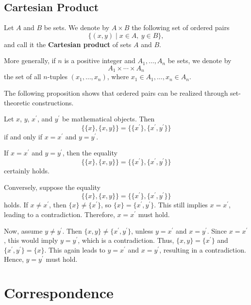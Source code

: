 \documentclass{book}
\begin{document}
\section{Cartesian Product}

\begin{definitionenv}
Let \(A\) and \(B\) be sets. We denote by \(A \times B\) the following set of ordered pairs
\[
\{(x, y) \mid x \in A,\ y \in B\},
\]
and call it the \textbf{Cartesian product} of sets \(A\) and \(B\).

More generally, if \(n\) is a positive integer and \(A_1, \ldots, A_n\) be sets, we denote by
\[
A_1 \times \cdots \times A_n
\]
the set of all \(n\)-tuples \((x_1, \ldots, x_n)\), where \(x_1 \in A_1, \ldots, x_n \in A_n\).
\end{definitionenv}

The following proposition shows that ordered pairs can be realized through set-theoretic constructions.

\begin{propositionenv}
Let \(x\), \(y\), \(x^{\prime}\), and \(y^{\prime}\) be mathematical objects. Then
\[
\{\{x\},\{x,y\}\}=\{\{x^{\prime}\},\{x^{\prime},y^{\prime}\}\}
\]
if and only if \(x=x^{\prime}\) and \(y=y^{\prime}\).
\end{propositionenv}

\begin{proofenv}
If \(x=x^{\prime}\) and \(y=y^{\prime}\), then the equality
\[
\{\{x\},\{x,y\}\}=\{\{x^{\prime}\},\{x^{\prime},y^{\prime}\}\}
\]
certainly holds.

Conversely, suppose the equality
\[
\{\{x\},\{x,y\}\}=\{\{x^{\prime}\},\{x^{\prime},y^{\prime}\}\}
\]
holds. If \(x\neq x^{\prime}\), then \(\{x\}\neq\{x^{\prime}\}\), so \(\{x\}=\{x^{\prime},y^{\prime}\}\). This still implies \(x=x^{\prime}\), leading to a contradiction. Therefore, \(x=x^{\prime}\) must hold.

Now, assume \(y\neq y^{\prime}\). Then \(\{x,y\}\neq\{x^{\prime},y^{\prime}\}\), unless \(y=x^{\prime}\) and \(x=y^{\prime}\). Since \(x=x^{\prime}\), this would imply \(y=y^{\prime}\), which is a contradiction. Thus, \(\{x,y\}=\{x^{\prime}\}\) and \(\{x^{\prime},y^{\prime}\}=\{x\}\). This again leads to \(y=x^{\prime}\) and \(x=y^{\prime}\), resulting in a contradiction. Hence, \(y=y^{\prime}\) must hold.
\end{proofenv}

\chapter{Correspondence}
\end{document}
